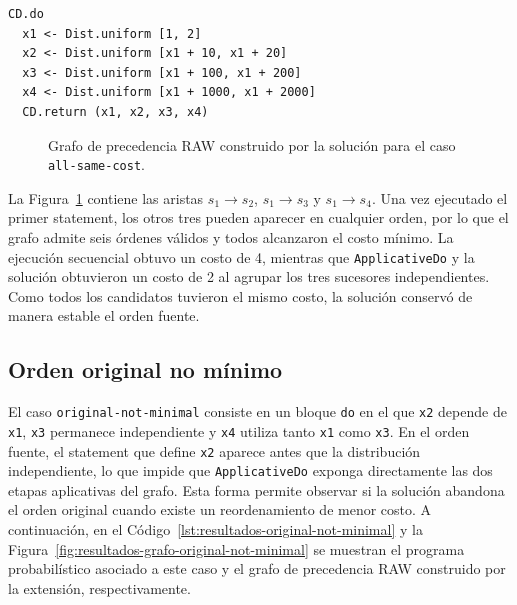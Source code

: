 \begin{lstlisting}[style=haskell,caption={Programa probabilístico asociado al caso \texttt{all-same-cost}.},label={lst:resultados-all-same-cost}]
CD.do
  x1 <- Dist.uniform [1, 2]
  x2 <- Dist.uniform [x1 + 10, x1 + 20]
  x3 <- Dist.uniform [x1 + 100, x1 + 200]
  x4 <- Dist.uniform [x1 + 1000, x1 + 2000]
  CD.return (x1, x2, x3, x4)
\end{lstlisting}

\begin{figure}[ht]
\centering
\begingroup
\setgraphnodesize{1.7cm}{1.0cm}{8pt}
\begin{PrecedenceGraph}[node distance=0.4cm and 0.45cm]
\end{PrecedenceGraph}
\endgroup
\caption[Grafo RAW del caso \texttt{all-same-cost}.]{Grafo de precedencia RAW construido por la solución para el caso \texttt{all-same-cost}.}
\label{fig:resultados-grafo-all-same-cost}
\end{figure}

La Figura~\ref{fig:resultados-grafo-all-same-cost} contiene las aristas $s_1\to s_2$, $s_1\to s_3$ y $s_1\to s_4$. Una vez ejecutado el primer statement, los otros tres pueden aparecer en cualquier orden, por lo que el grafo admite seis órdenes válidos y todos alcanzaron el costo mínimo. La ejecución secuencial obtuvo un costo de 4, mientras que \texttt{ApplicativeDo} y la solución obtuvieron un costo de 2 al agrupar los tres sucesores independientes. Como todos los candidatos tuvieron el mismo costo, la solución conservó de manera estable el orden fuente.

\subsection{Orden original no mínimo}

El caso \texttt{original-not-minimal} consiste en un bloque \texttt{do} en el que \texttt{x2} depende de \texttt{x1}, \texttt{x3} permanece independiente y \texttt{x4} utiliza tanto \texttt{x1} como \texttt{x3}. En el orden fuente, el statement que define \texttt{x2} aparece antes que la distribución independiente, lo que impide que \texttt{ApplicativeDo} exponga directamente las dos etapas aplicativas del grafo. Esta forma permite observar si la solución abandona el orden original cuando existe un reordenamiento de menor costo. A continuación, en el Código~\ref{lst:resultados-original-not-minimal} y la Figura~\ref{fig:resultados-grafo-original-not-minimal} se muestran el programa probabilístico asociado a este caso y el grafo de precedencia RAW construido por la extensión, respectivamente.

